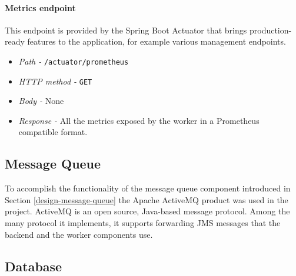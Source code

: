 \paragraph{Metrics endpoint} This endpoint is provided by the Spring Boot Actuator that brings production-ready features to the application, for example various management endpoints.
\begin{itemize}
	\item \emph{Path - } \texttt{/actuator/prometheus}
	\item \emph{HTTP method - } \texttt{GET}
	\item \emph{Body - } None
	\item \emph{Response - } All the metrics exposed by the worker in a Prometheus compatible format.
\end{itemize}

\subsection{Message Queue} \label{impl-message-queue}


To accomplish the functionality of the message queue component introduced in Section \ref{design-message-queue} the Apache ActiveMQ \cite{ActiveMQ} product was used in the project. ActiveMQ is an open source, Java-based message protocol. Among the many protocol it implements, it supports forwarding JMS messages that the backend and the worker components use.

\subsection{Database}


